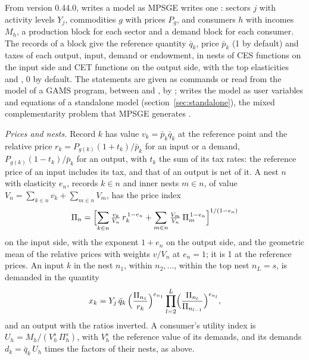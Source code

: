 From version 0.44.0,  writes a model as MPSGE writes one
\citep{rutherford1999}: sectors $j$ with activity levels $Y_j$, commodities
$g$ with prices $P_g$, and consumers $h$ with incomes $M_h$, a production
block for each sector and a demand block for each consumer. The records of a
block give the reference quantity $\bar q_k$, price $\bar p_k$ (1 by
default) and taxes of each output, input, demand or endowment, in nests of
CES functions on the input side and CET functions on the output side, with
the top elasticities  and , 0 by default. The statements are
given as commands or read from the model of a GAMS program, between
 and , by ;  writes the model as user variables and equations of a standalone model
(section~\ref{sec:standalone}), the mixed complementarity problem that MPSGE
generates \citep{mathiesen1985,rutherford1995}.

\textit{Prices and nests.} Record $k$ has value $v_k = \bar p_k \bar q_k$ at
the reference point and the relative price $r_k = P_{g(k)}(1 + t_k)/\bar
p_k$ for an input or a demand, $P_{g(k)}(1 - t_k)/\bar p_k$ for an output,
with $t_k$ the sum of its tax rates: the reference price of an input
includes its tax, and that of an output is net of it. A nest $n$ with
elasticity $e_n$, records $k \in n$ and inner nests $m \in n$, of value $V_n
= \sum_{k \in n} v_k + \sum_{m \in n} V_m$, has the price index
\begin{equation*}
\Pi_n = \Bigl[\sum_{k \in n} \tfrac{v_k}{V_n}\, r_k^{\,1 - e_n} +
\sum_{m \in n} \tfrac{V_m}{V_n}\, \Pi_m^{\,1 - e_n}\Bigr]^{1/(1 - e_n)}
\end{equation*}
on the input side, with the exponent $1 + e_n$ on the output side, and the
geometric mean of the relative prices with weights $v/V_n$ at $e_n = 1$; it
is 1 at the reference prices. An input $k$ in the nest $n_1$, within
$n_2, \dots$, within the top nest $n_L = s$, is demanded in the quantity
\begin{equation*}
x_k = Y_j\,\bar q_k\,\Bigl(\frac{\Pi_{n_1}}{r_k}\Bigr)^{e_{n_1}}
\prod_{l=2}^{L} \Bigl(\frac{\Pi_{n_l}}{\Pi_{n_{l-1}}}\Bigr)^{e_{n_l}},
\end{equation*}
and an output with the ratios inverted. A consumer's utility index is $U_h =
M_h/(V^s_h\,\Pi^s_h)$, with $V^s_h$ the reference value of its demands, and
its demands $d_k = \bar q_k\,U_h$ times the factors of their nests, as
above.

